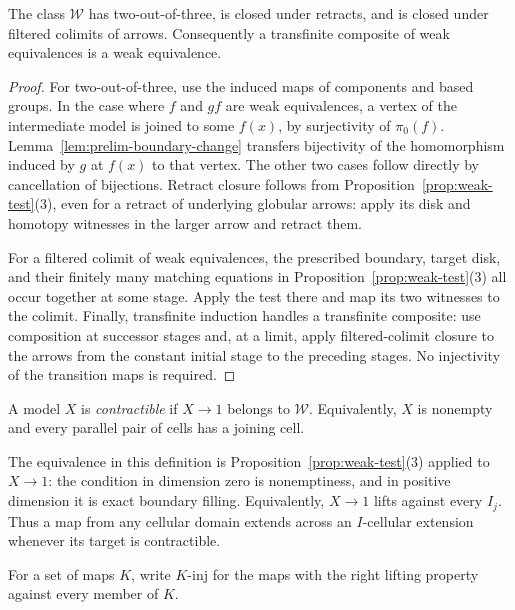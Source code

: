 \begin{lemma}\label{lem:weak-closure}
The class $\mathcal W$ has two-out-of-three, is closed under
retracts, and is closed under filtered colimits of arrows.
Consequently a transfinite composite of weak equivalences is
a weak equivalence.
\end{lemma}

\begin{proof}
For two-out-of-three, use the induced maps of components and
based groups.  In the case where $f$ and $gf$ are weak
equivalences, a vertex of the intermediate model is joined to
some $f(x)$, by surjectivity of $\pi_0(f)$.
Lemma~\ref{lem:prelim-boundary-change} transfers bijectivity
of the homomorphism induced by $g$ at $f(x)$ to that vertex.
The other two cases follow directly by cancellation of
bijections.  Retract closure follows from
Proposition~\ref{prop:weak-test}(3), even for a retract of
underlying globular arrows: apply its disk and homotopy
witnesses in the larger arrow and retract them.

For a filtered colimit of weak equivalences, the prescribed
boundary, target disk, and their finitely many matching
equations in Proposition~\ref{prop:weak-test}(3) all occur
together at some stage.  Apply the test there and map its
two witnesses to the colimit.  Finally, transfinite induction
handles a transfinite composite: use composition at successor
stages and, at a limit, apply filtered-colimit closure to the
arrows from the constant initial stage to the preceding stages.
No injectivity of the transition maps is required.
\end{proof}

\begin{definition}\label{def:prelim-contractible}
A model $X$ is \emph{contractible} if $X\to1$ belongs to
$\mathcal W$.  Equivalently, $X$ is nonempty and every
parallel pair of cells has a joining cell.
\end{definition}

The equivalence in this definition is
Proposition~\ref{prop:weak-test}(3) applied to $X\to1$:
the condition in dimension zero is nonemptiness, and in
positive dimension it is exact boundary filling.  Equivalently,
$X\to1$ lifts against every $I_j$.  Thus a map from any
cellular domain extends across an $I$-cellular extension
whenever its target is contractible.

For a set of maps $K$, write $K\text{-}\mathrm{inj}$ for the maps
with the right lifting property against every member of $K$.

